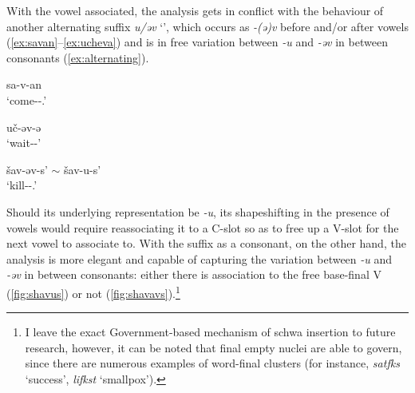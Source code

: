 \documentclass[a4paper, 12pt]{article}
\begin{document}
	\noindent With the vowel associated, the analysis gets in conflict with the behaviour of another alternating suffix \emph{u/əv} `{\Pass}', which occurs as \emph{-(ə)v} before and/or after vowels (\ref{ex:savan}--\ref{ex:ucheva}) and is in free variation between \emph{-u} and \emph{-əv} in between consonants (\ref{ex:alternating}). 
	
\begin{minipage}[t]{.3\linewidth}
\ex\label{ex:savan}
	sa-v-an \\`come-{\Pass}-{\Npst}.{\Fsg}'
\xe
\end{minipage}
\hfill
\begin{minipage}[t]{.3\linewidth}
\ex\label{ex:ucheva}
	uč-əv-ə \\`wait-{\Pass}-{\Cn}' 
\xe
\end{minipage}	
\hfill
\begin{minipage}[t]{.3\linewidth}
\ex\label{ex:alternating}
	šav-əv-s' $\sim$ šav-u-s' \\ `kill-{\Pass}-{\Pst}.{\Tsg}'
\xe
\end{minipage}	
	
	\noindent Should its underlying representation be \emph{-u}, its shapeshifting in the presence of vowels would require reassociating it to a C-slot so as to free up a V-slot for the next vowel to associate to. With the suffix as a consonant, on the other hand, the analysis is more elegant and capable of capturing the variation between \emph{-u} and \emph{-əv} in between consonants: either there is association to the free base-final V (\ref{fig:shavus}) or not (\ref{fig:shavavs}).\footnote{I leave the exact Government-based mechanism of schwa insertion to future research, however, it can be noted that final empty nuclei are able to govern, since there are numerous examples of word-final clusters (for instance, \emph{satfks} `success', \emph{lifkst} `smallpox').}
	
\end{document}

